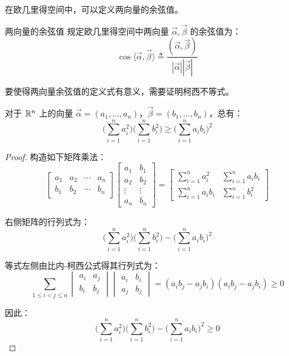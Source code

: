 在欧几里得空间中，可以定义两向量的余弦值。

\begin{definition}{两向量的余弦值}
	规定欧几里得空间中两向量 $\vec \alpha, \vec \beta$ 的余弦值为：
	$$
	\cos \langle \vec \alpha, \vec \beta \rangle \triangleq \dfrac{(\vec \alpha, \vec \beta)}{|\vec \alpha| |\vec \beta|}
	$$
\end{definition}

要使得两向量余弦值的定义式有意义，需要证明柯西不等式。

\begin{theorem}[柯西不等式]
	对于 $\mathbb R^n$ 上的向量 $\vec \alpha = (a_1, \ldots, a_n)$，$\vec \beta = (b_1, \ldots, b_n)$，总有：
	$$
	\biggl( \sum\limits_{i = 1}^n a_i^2 \biggr) \biggl( \sum\limits_{i = 1}^n b_i^2 \biggr) \ge \biggl( \sum\limits_{i = 1}^n a_i b_i \biggr)^2
	$$
\end{theorem}

\begin{proof}
	构造如下矩阵乘法：
	$$
	\begin{bmatrix}
		a_1 & a_2 & \cdots & a_n
		\\
		b_1 & b_2 & \cdots & b_n
	\end{bmatrix}
	\begin{bmatrix}
		a_1 & b_1
		\\
		a_2 & b_2
		\\
		\vdots & \vdots
		\\
		a_n & b_n
	\end{bmatrix}
	=
	\begin{bmatrix}
		\sum\limits_{i = 1}^n a_i^2 & \sum\limits_{i = 1}^n a_i b_i
		\\
		\sum\limits_{i = 1}^n a_i b_i & \sum\limits_{i = 1}^n b_i^2
	\end{bmatrix}
	$$

	右侧矩阵的行列式为：
	$$
	\biggl( \sum\limits_{i = 1}^n a_i^2 \biggr) \biggl( \sum\limits_{i = 1}^n b_i^2 \biggr) - \biggl( \sum\limits_{i = 1}^n a_i b_i \biggr)^2
	$$

	等式左侧由比内-柯西公式得其行列式为：
	$$
	\sum\limits_{1 \le i < j \le n} \begin{vmatrix} a_i & a_j \\ b_i & b_j \end{vmatrix} \begin{vmatrix} a_i & b_i \\ a_j & b_j \end{vmatrix} = (a_i b_j - a_j b_i)(a_i b_j - a_j b_i) \ge 0
	$$

	因此：
	$$
	\biggl( \sum\limits_{i = 1}^n a_i^2 \biggr) \biggl( \sum\limits_{i = 1}^n b_i^2 \biggr) - \biggl( \sum\limits_{i = 1}^n a_i b_i \biggr)^2 \ge 0
	$$
\end{proof}

